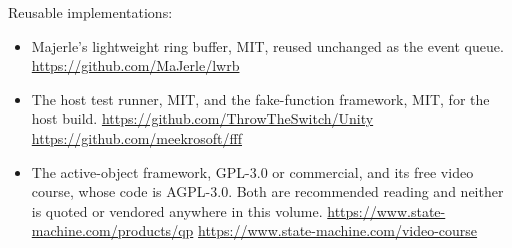 Reusable implementations:
\begin{itemize}
\item Majerle's lightweight ring buffer, MIT, reused unchanged as the event
queue.\newline
\url{https://github.com/MaJerle/lwrb}
\item The host test runner, MIT, and the fake-function framework, MIT, for the
host build.\newline
\url{https://github.com/ThrowTheSwitch/Unity}\newline
\url{https://github.com/meekrosoft/fff}
\item The active-object framework, GPL-3.0 or commercial, and its free video
course, whose code is AGPL-3.0. Both are recommended reading and neither is
quoted or vendored anywhere in this volume.\newline
\url{https://www.state-machine.com/products/qp}\newline
\url{https://www.state-machine.com/video-course}
\end{itemize}
